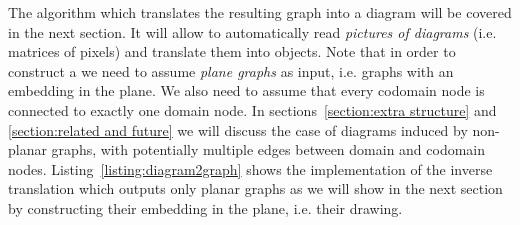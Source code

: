 The  algorithm which translates the resulting graph into a diagram will be covered in the next section.
It will allow to automatically read \emph{pictures of diagrams} (i.e. matrices of pixels) and translate them into  objects.
Note that in order to construct a  we need to assume \emph{plane graphs} as input, i.e. graphs with an embedding in the plane.
We also need to assume that every codomain node is connected to exactly one domain node.
In sections~\ref{section:extra structure} and \ref{section:related and future} we will discuss the case of diagrams induced by non-planar graphs, with potentially multiple edges between domain and codomain nodes.
Listing~\ref{listing:diagram2graph} shows the implementation of the inverse translation  which outputs only planar graphs as we will show in the next section by constructing their embedding in the plane, i.e. their drawing.
